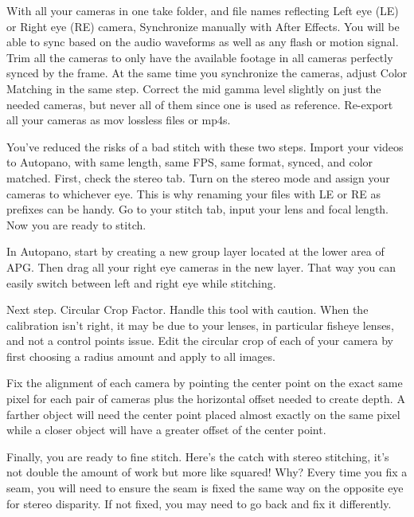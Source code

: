 \begin{fullwidth}
With all your cameras in one take folder, and file names reflecting Left eye (LE) or Right eye (RE) camera, Synchronize manually with After Effects. You will be able to sync based on the audio waveforms as well as any flash or motion signal. Trim all the cameras to only have the available footage in all cameras perfectly synced by the frame. At the same time you synchronize the cameras, adjust Color Matching in the same step. Correct the mid gamma level slightly on just the needed cameras, but never all of them since one is used as reference. Re-export all your cameras as mov lossless files or mp4s.


You’ve reduced the risks of a bad stitch with these two steps. Import your videos to Autopano, with same length, same FPS, same format, synced, and color matched. First, check the stereo tab. Turn on the stereo mode and assign your cameras to whichever eye. This is why renaming your files with LE or RE as prefixes can be handy. Go to your stitch tab, input your lens and focal length. Now you are ready to stitch. 


In Autopano, start by creating a new group layer located at the lower area of APG. Then drag all your right eye cameras in the new layer. That way you can easily switch between left and right eye while stitching.


Next step. Circular Crop Factor. Handle this tool with caution. When the calibration isn't right, it may be due to your lenses, in particular fisheye lenses, and not a control points issue. Edit the circular crop of each of your camera by first choosing a radius amount and apply to all images. 


Fix the alignment of each camera by pointing the center point on the exact same pixel for each pair of cameras plus the horizontal offset needed to create depth. A farther object will need the center point placed almost exactly on the same pixel while a closer object will have a greater offset of the center point. 



Finally, you are ready to fine stitch. Here’s the catch with stereo stitching, it’s not double the amount of work but more like squared! Why? Every time you fix a seam, you will need to ensure the seam is fixed the same way on the opposite eye for stereo disparity. If not fixed, you may need to go back and fix it differently. 


\end{fullwidth}
